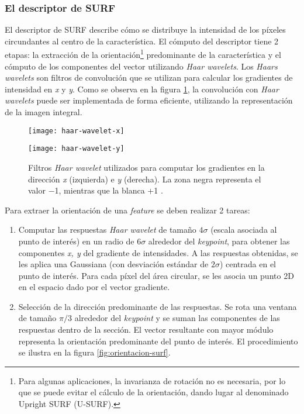 \subsubsection{El descriptor de SURF}
El descriptor de SURF describe cómo se distribuye la intensidad de los píxeles circundantes al centro de la característica. El cómputo del descriptor tiene 2 etapas: la extracción de la orientación\footnote{Para algunas aplicaciones, la invarianza de rotación no es necesaria, por lo que se puede evitar el cálculo de la orientación, dando lugar al denominado Upright SURF (U-SURF).} 
predominante de la característica y el cómputo de los componentes del vector utilizando \textit{Haar wavelets}. Los \textit{Haars wavelets} son filtros de convolución que se utilizan para calcular los gradientes de intensidad en \textit{x} y \textit{y}. Como se observa en la figura \ref{fig:haar-wavelet}, la convolución con \textit{Haar wavelets} puede ser implementada de forma eficiente, utilizando la representación de la imagen integral.

\begin{figure}[ht]
\centering
\begin{minipage}[h]{.45\textwidth}
\begin{center}
\texttt{[image: haar-wavelet-x]}
\end{center}
\end{minipage}
\hfill
\begin{minipage}[h]{.45\textwidth}
\begin{center}
\texttt{[image: haar-wavelet-y]}
\end{center}
\end{minipage}
\hfill
\caption[Haar wavelet]{Filtros \textit{Haar wavelet} utilizados para computar los gradientes en la dirección \textit{x} (izquierda) e \textit{y} (derecha). La zona negra representa el valor −1, mientras que la blanca +1 \cite{bay2008speeded}.}
\label{fig:haar-wavelet}
\end{figure}

Para extraer la orientación de una \textit{feature} se deben realizar 2 tareas:
\begin{enumerate}

\item Computar las respuestas \textit{Haar wavelet} de tamaño $4\sigma$ (escala asociada al punto de interés) en un radio de $6\sigma$ alrededor del \textit{keypoint}, para obtener las componentes \textit{x, y} del gradiente de intensidades. A las respuestas obtenidas, se les aplica una Gaussiana (con desviación estándar de $2\sigma$) centrada en el punto de interés. Para cada píxel del área circular, se les asocia un punto 2D en el espacio dado por el vector gradiente.

\item Selección de la dirección predominante de las respuestas. Se rota una ventana de tamaño $\pi/3$ alrededor del \textit{keypoint} y se suman las componentes de las respuestas dentro de la sección. El vector resultante con mayor módulo representa la orientación predominante del punto de interés. El procedimiento se ilustra en la figura \ref{fig:orientacion-surf}.

\end{enumerate}

